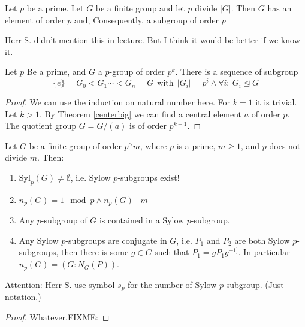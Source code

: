 \begin{theorem}
    Let \(p\) be a prime. Let \(G\) be a finite group and let \(p\) divide \(|G|\). Then \(G\) has an element of order \(p\) and, Consequently, a subgroup of order \(p\)    
\end{theorem}
\begin{remark}
    Herr S. didn't mention this in lecture. But I think it would be better if we know it.
\end{remark}

\begin{theorem}
     Let \(p\) Be a prime, and \(G\) a \(p\)-group of order \(p^k\). There is a sequence of subgroup\[\{e\}=G_0<G_1\cdots <G_n =  G\ \ \text{with}\ \ |G_i|=p^i \wedge \forall i:\  G_i\trianglelefteq G \]
\end{theorem}
\begin{proof}
    We can use the induction on natural number here. For \(k = 1\) it is trivial. Let \(k>1\). By Theorem \ref{centerbig} we can find a central element \(a\) of order \(p\). The quotient group \(\bar{G} = G / (a)\) is of order \(p^{k-1}\).
\end{proof}

\begin{theorem}[Sylow]
    Let \(G\) be a finite group of order \(p^\alpha m\), where \(p\) is a prime, \(m\geq 1\), and \(p\) does not divide \(m\). Then: \begin{enumerate}
        \item \(\mathrm{Syl}_p(G)\not = \emptyset\), i.e. Sylow \(p\)-subgroups exist!
        \item \(n_p(G) = 1\mod p \wedge n_p(G) \mid m\)
        \item  Any \(p\)-subgroup of \(G\) is contained in a Sylow \(p\)-subgroup.
        \item Any Sylow \(p\)-subgroups are conjugate in \(G\), i.e. \(P_1\) and \(P_2\) are both Sylow \(p\)-subgroups, then there is some \(g\in G\) such that \(P_1 = gP_1 g^{-1]}\). In particular \(n_p(G) = (G:N_G(P))\).
    \end{enumerate}    
\end{theorem}
\begin{remark}
    Attention: Herr S. use symbol \(s_p\) for the number of Sylow \(p\)-subgroup. (Just notation.)
\end{remark}
\begin{proof}
    Whatever.FIXME:
\end{proof}